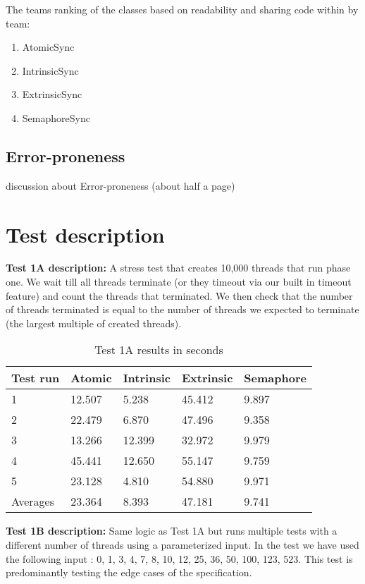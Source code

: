 \documentclass[11pt]{article}
\begin{document}
The teams ranking of the classes based on readability and sharing code within by team: 

\begin{enumerate}
	\item AtomicSync
	\item IntrinsicSync
	\item ExtrinsicSync
	\item SemaphoreSync
\end{enumerate}

\pagebreak
\subsection{Error-proneness}
discussion about Error-proneness (about half a page)

\newpage
\appendix
\section{Test description}
\textbf{Test 1A description:} A stress test that creates 10,000 threads that run phase one. We wait till all threads terminate (or they timeout via our built in timeout feature) and count the threads that terminated. We then check that the number of threads terminated is equal to the number of threads we expected to terminate (the largest multiple of created threads).\\



\begin{table}[H]
\centering
\caption{Test 1A results in seconds}
\label{tab:my-table}
\begin{tabular}{|l|l|l|l|l|}
\hline
Test run & Atomic & Intrinsic & Extrinsic & Semaphore \\ \hline
1        & 12.507 & 5.238     & 45.412    & 9.897     \\ \hline
2        & 22.479 & 6.870     & 47.496    & 9.358     \\ \hline
3        & 13.266 & 12.399    & 32.972    & 9.979     \\ \hline
4        & 45.441 & 12.650    & 55.147    & 9.759     \\ \hline
5        & 23.128 & 4.810     & 54.880    & 9.971     \\ \hline
Averages & 23.364 & 8.393     & 47.181    & 9.741     \\ \hline
\end{tabular}
\end{table}

\textbf{Test 1B description:} Same logic as Test 1A but runs multiple tests with a different number of threads using a parameterized input. In the test we have used the following input : {0, 1, 3, 4, 7, 8, 10, 12, 25, 36, 50, 100, 123, 523}. This test is predominantly testing the edge cases of the specification. \\
\end{document}
